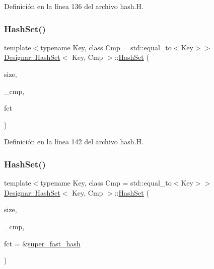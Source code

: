 Definición en la línea 136 del archivo hash.\+H.

\mbox{\label{class_designar_1_1_hash_set_aa57bbddb93c59eda7551cf9cf6b9220e}} 
\subsubsection{\texorpdfstring{Hash\+Set()}{HashSet()}\hspace{0.1cm}{\footnotesize\ttfamily [3/12]}}
{\footnotesize\ttfamily template$<$typename Key, class Cmp = std\+::equal\+\_\+to$<$\+Key$>$$>$ \\
\hyperlink{class_designar_1_1_hash_set}{Designar\+::\+Hash\+Set}$<$ Key, Cmp $>$\+::\hyperlink{class_designar_1_1_hash_set}{Hash\+Set} (\begin{DoxyParamCaption}\item[{\hyperlink{namespace_designar_aa72662848b9f4815e7bf31a7cf3e33d1}{nat\+\_\+t}}]{size,  }\item[{Cmp \&\&}]{\+\_\+cmp,  }\item[{\hyperlink{class_designar_1_1_hash_set_a05d8d111665c25bc17290c01fa299398}{Hash\+Fct\+Type}}]{fct }\end{DoxyParamCaption})\hspace{0.3cm}{\ttfamily [inline]}}



Definición en la línea 142 del archivo hash.\+H.

\mbox{\label{class_designar_1_1_hash_set_ac9204afce59af28d1360c50f11b5694e}} 
\subsubsection{\texorpdfstring{Hash\+Set()}{HashSet()}\hspace{0.1cm}{\footnotesize\ttfamily [4/12]}}
{\footnotesize\ttfamily template$<$typename Key, class Cmp = std\+::equal\+\_\+to$<$\+Key$>$$>$ \\
\hyperlink{class_designar_1_1_hash_set}{Designar\+::\+Hash\+Set}$<$ Key, Cmp $>$\+::\hyperlink{class_designar_1_1_hash_set}{Hash\+Set} (\begin{DoxyParamCaption}\item[{\hyperlink{namespace_designar_aa72662848b9f4815e7bf31a7cf3e33d1}{nat\+\_\+t}}]{size,  }\item[{Cmp \&}]{\+\_\+cmp,  }\item[{\hyperlink{class_designar_1_1_hash_set_a7a8b0a4970519ebc9ccc1ad247d0639f}{Hash\+Fct\+Ptr}}]{fct = {\ttfamily \&\hyperlink{namespace_designar_afd5712d16b3ae1c1c7d59f1004cd96fd}{super\+\_\+fast\+\_\+hash}} }\end{DoxyParamCaption})\hspace{0.3cm}{\ttfamily [inline]}}




